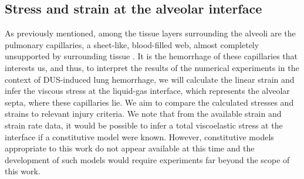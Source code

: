 \subsection{Stress and strain at the alveolar interface}%
\label{subsec:usbe_lung_bio_stress_strain}
As previously mentioned, among the tissue layers surrounding the
alveoli are the pulmonary capillaries, a sheet-like, blood-filled web,
almost completely unsupported by surrounding tissue
\citep{West1991}. It is the hemorrhage of these capillaries that
interests us, and thus, to interpret the results of the numerical
experiments in the context of \ac{DUS}-induced lung hemorrhage, we
will calculate the linear strain and infer the viscous stress at the
liquid-gas interface, which represents the alveolar septa, where these
capillaries lie. We aim to compare the calculated stresses and strains
to relevant injury criteria. We note that from the available strain
and strain rate data, it would be possible to infer a total
viscoelastic stress at the interface if a constitutive model were
known. However, constitutive models appropriate to this work do not
appear available at this time and the development of such models would
require experiments far beyond the scope of this work.%

